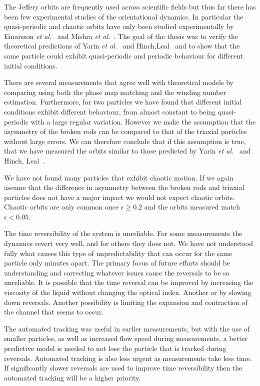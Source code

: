 The Jeffery orbits are frequently used across scientific fields but thus far there has been few experimental studies 
of the orientational dynamics. In particular the quasi-periodic and chaotic orbits have only been studied experimentally
by Einarsson \emph{et al.}~\cite{JonasExperiment} and Mishra \emph{et al.}~\cite{Mishra}.
The goal of the thesis was to verify the theoretical predictions of Yarin \emph{et al.}~\cite{Yarin} and Hinch,Leal~\cite{Leal} and to show that the same particle could exhibit quasi-periodic and periodic behaviour for different initial conditions.


There are several measurements that agree well with theoretical models by comparing using both the phase map matching and the winding number estimation. Furthermore, for two particles we have found that different initial conditions exhibit different behaviour, 
from almost constant to being quasi-periodic with a large regular variation. However we make the assumption that the asymmetry of the broken rods can be compared to that of the triaxial particles without large errors. We can therefore conclude that if this assumption is true, that we have measured the
orbits similar to those predicted by Yarin \emph{et al.}~\cite{Yarin} and Hinch, Leal~\cite{Leal}. 

We have not found many particles that exhibit chaotic motion. If we again assume that the difference in asymmetry between the broken rods and triaxial particles does not have a major impact we would not expect chaotic orbits. Chaotic orbits are only common once $\epsilon \geq 0.2$\cite{AntonThesis} and the orbits measured match $\epsilon < 0.05$. 

The time reversibility of the system is unreliable. For some measurements the dynamics revert very well, and for others they does not. 
We have not understood fully what causes this type of unpredictability that can occur for the same particle only 
minutes apart. The primary focus of future efforts should be understanding and correcting whatever issues cause the 
reversals to be so unreliable. It is possible that the time reversal can be improved by increasing the viscosity of the liquid
without changing the optical index. Another or by slowing down reversals. Another possibility is limiting the 
expansion and contraction of the channel that seems to occur.

The automated tracking was useful in earlier measurements, but with the use of smaller particles, as well as increased flow speed during measurements, 
a better predictive model is needed to not lose the particle that is tracked during reversals. Automated tracking is also less urgent as
measurements take less time. If significantly slower reversals are used to improve time reversibility then the automated tracking will be a higher priority.